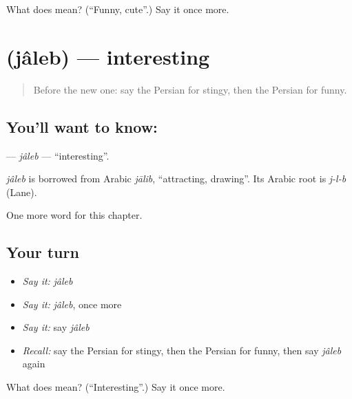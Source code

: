 \begin{tcolorbox}[breakable,colback=teal!4,colframe=teal!35!black,title={Before you move on}]
What does  mean? (\textquotedblleft{}Funny, cute\textquotedblright{}.) Say it once more.
\end{tcolorbox}
\section[\texorpdfstring{\fa{جالب} (jâleb)}{جالب (jâleb)}]{ (jâleb) — interesting}

\label{lesson:FA-C236-jaleb}



\begin{quote}
Before the new one: say the Persian for stingy, then the Persian for funny.
\end{quote}

\subsection*{You'll want to know: }
\textbf{} — \emph{jâleb} — \textquotedblleft{}interesting\textquotedblright{}.

\begin{cousinweb}
\emph{jâleb} is borrowed from Arabic \emph{jālib}, \textquotedblleft{}attracting, drawing\textquotedblright{}. Its Arabic root is \emph{j-l-b} (Lane).
\end{cousinweb}

\begin{grammarlens}[title={What you've built}]
One more word for this chapter.
\end{grammarlens}

\subsection*{Your turn}
\begin{itemize}
\raggedright
  \item \emph{Say it:} \emph{jâleb}
  \item \emph{Say it:} \emph{jâleb}, once more
  \item \emph{Say it:} say \emph{jâleb}
  \item \emph{Recall:} say the Persian for stingy, then the Persian for funny, then say \emph{jâleb} again
\end{itemize}

\begin{tcolorbox}[breakable,colback=teal!4,colframe=teal!35!black,title={Before you move on}]
What does  mean? (\textquotedblleft{}Interesting\textquotedblright{}.) Say it once more.
\end{tcolorbox}
